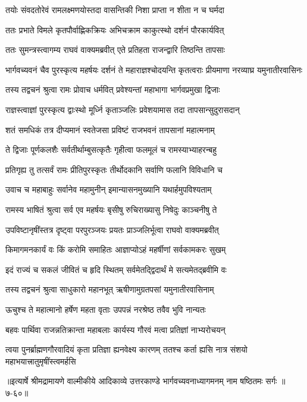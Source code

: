 
\twolineshloka
{तयोः संवदतोरेवं रामलक्ष्मणयोस्तदा}
{वासन्तिकी निशा प्राप्ता न शीता न च घर्मदा} %

\twolineshloka
{ततः प्रभाते विमले कृतपौर्वाह्णिकक्रियः}
{अभिचक्राम काकुत्स्थो दर्शनं पौरकार्यवित्} %

\twolineshloka
{ततः सुमन्त्रस्त्वागम्य राघवं वाक्यमब्रवीत्}
{एते प्रतिहता राजन्द्वारि तिष्ठन्ति तापसाः} %

\threelineshloka
{भार्गवच्यवनं चैव पुरस्कृत्य महर्षयः}
{दर्शनं ते महाराज्ञश्चोदयन्ति कृतत्वराः}
{प्रीयमाणा नरव्याघ्र यमुनातीरवासिनः} %

\twolineshloka
{तस्य तद्वचनं श्रुत्वा रामः प्रोवाच धर्मवित्}
{प्रवेश्यन्तां महाभागा भार्गवप्रमुखा द्विजाः} %

\twolineshloka
{राज्ञस्त्वाज्ञां पुरस्कृत्य द्वाःस्थो मूर्ध्नि कृताञ्जलिः}
{प्रवेशयामास तदा तापसान्सुदुरासदान्} %

\twolineshloka
{शतं समधिकं तत्र दीप्यमानं स्वतेजसा}
{प्रविष्टं राजभवनं तापसानां महात्मनाम्} %

\twolineshloka
{ते द्विजाः पूर्णकलशैः सर्वतीर्थाम्बुसत्कृतैः}
{गृहीत्वा फलमूलं च रामस्याभ्याहरन्बहु} %

\twolineshloka
{प्रतिगृह्य तु तत्सर्वं रामः प्रीतिपुरस्कृतः}
{तीर्थोदकानि सर्वाणि फलानि विविधानि च} %

\twolineshloka
{उवाच च महाबाहुः सर्वानेव महामुनीन्}
{इमान्यासनमुख्यानि यथार्हमुपविश्यताम्} %

\twolineshloka
{रामस्य भाषितं श्रुत्वा सर्व एव महर्षयः}
{बृसीषु रुचिराख्यासु निषेदुः काञ्चनीषु ते} %

\twolineshloka
{उपविष्टानृषींस्तत्र दृष्ट्वा परपुरञ्जयः}
{प्रयतः प्राञ्जलिर्भूत्वा राघवो वाक्यमब्रवीत्} %

\twolineshloka
{किमागमनकार्यं वः किं करोमि समाहितः}
{आज्ञाप्योऽहं महर्षीणां सर्वकामकरः सुखम्} %

\twolineshloka
{इदं राज्यं च सकलं जीवितं च हृदि स्थितम्}
{सर्वमेतद्द्विदार्थं मे सत्यमेतद्ब्रवीमि वः} %

\twolineshloka
{तस्य तद्वचनं श्रुत्वा साधुकारो महानभूत्}
{ऋषीणामुग्रतपसां यमुनातीरवासिनाम्} %

\twolineshloka
{ऊचुश्च ते महात्मानो हर्षेण महता वृताः}
{उपपन्नं नरश्रेष्ठ तवैव भुवि नान्यतः} %

\twolineshloka
{बहवः पार्थिवा राजन्नतिक्रान्ता महाबलाः}
{कार्यस्य गौरवं मत्वा प्रतिज्ञां नाभ्यरोचयन्} %

\twolineshloka
{त्वया पुनर्ब्राह्मणगौरवादियं कृता प्रतिज्ञा ह्यनवेक्ष्य कारणम्}
{ततश्च कर्ता ह्यसि नात्र संशयो महाभयात्त्रातुमृषींस्त्वमर्हसि} %


॥इत्यार्षे श्रीमद्रामायणे वाल्मीकीये आदिकाव्ये उत्तरकाण्डे भार्गवच्यवनाध्यागमनम् नाम षष्ठितमः सर्गः ॥७-६०॥
